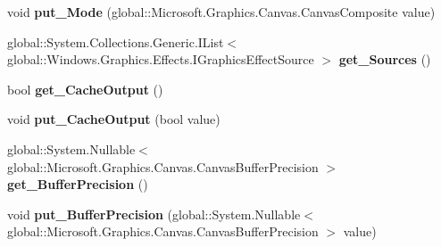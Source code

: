 \begin{DoxyCompactItemize}
\item 
\mbox{\label{class_microsoft_1_1_graphics_1_1_canvas_1_1_effects_1_1_composite_effect_ae7ce16aff8d9ed99b8886bff661b4e20}} 
void {\bfseries put\+\_\+\+Mode} (global\+::\+Microsoft.\+Graphics.\+Canvas.\+Canvas\+Composite value)
\item 
\mbox{\label{class_microsoft_1_1_graphics_1_1_canvas_1_1_effects_1_1_composite_effect_a8478bf885b21b246f10dc2bf0558e37c}} 
global\+::\+System.\+Collections.\+Generic.\+I\+List$<$ global\+::\+Windows.\+Graphics.\+Effects.\+I\+Graphics\+Effect\+Source $>$ {\bfseries get\+\_\+\+Sources} ()
\item 
\mbox{\label{class_microsoft_1_1_graphics_1_1_canvas_1_1_effects_1_1_composite_effect_a3c66fe91b91cc425331cdcb4f41beba8}} 
bool {\bfseries get\+\_\+\+Cache\+Output} ()
\item 
\mbox{\label{class_microsoft_1_1_graphics_1_1_canvas_1_1_effects_1_1_composite_effect_a39920fed4de684b9667e7d93c63dbb0c}} 
void {\bfseries put\+\_\+\+Cache\+Output} (bool value)
\item 
\mbox{\label{class_microsoft_1_1_graphics_1_1_canvas_1_1_effects_1_1_composite_effect_ac433461e33a3e94122754d4e470ae2a8}} 
global\+::\+System.\+Nullable$<$ global\+::\+Microsoft.\+Graphics.\+Canvas.\+Canvas\+Buffer\+Precision $>$ {\bfseries get\+\_\+\+Buffer\+Precision} ()
\item 
\mbox{\label{class_microsoft_1_1_graphics_1_1_canvas_1_1_effects_1_1_composite_effect_ad0b7d7f2cc2acbb85fe495fed77f265d}} 
void {\bfseries put\+\_\+\+Buffer\+Precision} (global\+::\+System.\+Nullable$<$ global\+::\+Microsoft.\+Graphics.\+Canvas.\+Canvas\+Buffer\+Precision $>$ value)
\item 
\mbox{\label{class_microsoft_1_1_graphics_1_1_canvas_1_1_effects_1_1_composite_effect_a8a4fb8c17ba9742bfb35ffb0d19554c6}} 

\end{DoxyCompactItemize}
